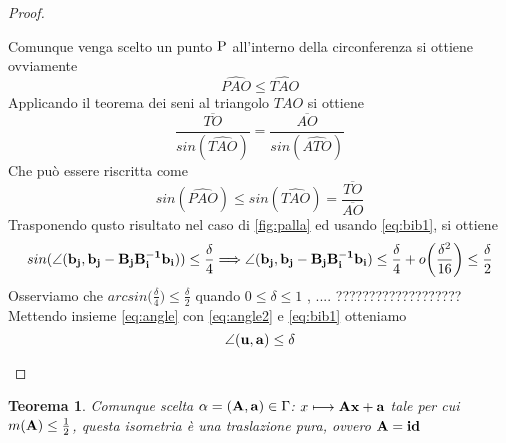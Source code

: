 \documentclass[a4paper,11pt,openright,twoside	]{book}
\newtheorem{theorem}{Teorema}[section]
\begin{document}
\begin{proof}
\begin{itemize}
\begin{figure}[h!]
\end{figure}
Comunque venga scelto un punto $ \rm P$ all'interno della circonferenza si ottiene ovviamente \\
\[ \widehat{PAO} \leq \widehat{TAO} \]
Applicando il teorema dei seni al triangolo $TAO$  si ottiene
\[ \frac{\overline{TO}}{sin( \widehat{TAO}) } = \frac{\overline{AO}}{sin( \widehat{ATO}) } \]
Che può essere riscritta come 
\begin{equation}
\label{eq:seni}
sin(\widehat{PAO}) \leq sin( \widehat{TAO})= \frac{\overline{TO}}{\overline{AO}}
\end{equation}
Trasponendo qusto risultato nel caso di \ref{fig:palla} ed usando \ref{eq:bib1}, si ottiene 
\begin{equation}
\label{eq:angle2}
sin(\angle(\vb{b_j}, \vb{b_j- B_j B_i^{-1} b_i} ) ) \leq \frac{\delta}{4}
\Longrightarrow \angle(\vb{b_j}, \vb{b_j- B_j B_i^{-1} b_i} ) \leq \frac{\delta}{4} + o \bigg( \frac{\delta^2}{16} \bigg) \leq \frac{\delta}{2}
\end{equation}
Osserviamo che $arcsin \bigg( \frac{\delta}{4} \bigg) \leq \frac{\delta}{2}$ 
quando $0 \leq \delta \leq 1$ , .... ???????????????????
Mettendo insieme \ref{eq:angle} con \ref{eq:angle2} e \ref{eq:bib1} otteniamo
\[ \angle (\vb{u, a}) \leq \delta \]
\end{itemize}
\end{proof}
\begin{theorem}
\label{lemma:bib}
 Comunque scelta $\alpha = (\vb{A, a}) \in \Gamma$:  $x \longmapsto \vb{Ax +a} $  tale per cui $m(\vb{A}) \leq \frac{1}{2} $, questa isometria è una traslazione pura, ovvero $\vb{A} = \vb{id}$
\end{theorem}
\end{document}
